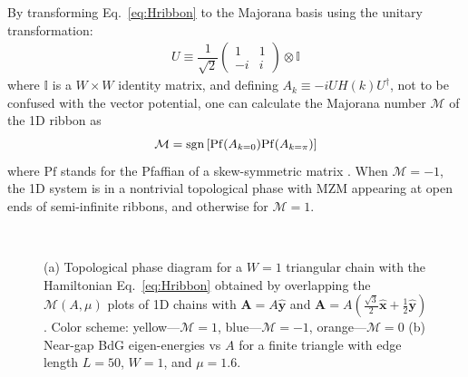 \documentclass[aps,prb,showpacs,amsmath,twocolumn,amssymb,superscriptaddress]{revtex4-2}
\let\oldhat\hat
\renewcommand{\hat}[1]{\oldhat{\mathbf{#1}}}
\begin{document}
By transforming Eq.~\eqref{eq:Hribbon} to the Majorana basis using the unitary transformation:
\begin{eqnarray}
    U\equiv \dfrac{1}{\sqrt{2}} \left(
  \begin{matrix}
    1 & 1 \\
    -i & i
  \end{matrix} \right) \otimes \mathbb{I}
\end{eqnarray}
where $\mathbb{I}$ is a ${W\times W}$ identity matrix, and defining $A_k\equiv -iU H(k) U^\dag$, not to be confused with the vector potential, one can calculate the Majorana number \cite{kitaevUnpairedMajoranaFermions2001} $\mathcal{M}$ of the 1D ribbon as \cite{liTopologicalSuperconductivityInduced2014}
\begin{eqnarray}
\mathcal{M} = {\rm sgn}\left[{{\rm Pf}(A_{k=0}) {\rm Pf}(A_{k=\pi})}\right]
\end{eqnarray}
where $\text{Pf}$ stands for the Pfaffian of a skew-symmetric matrix \cite{kitaevUnpairedMajoranaFermions2001}. When $\mathcal{M} = -1$, the 1D system is in a nontrivial topological phase with MZM appearing at open ends of semi-infinite ribbons, and otherwise for $\mathcal{M} = 1$.

\begin{figure}[ht]
  \hspace{6pt}
   \\
  \vspace{-15pt}
\caption{(a) Topological phase diagram for a $W=1$ triangular chain with the Hamiltonian Eq.~\eqref{eq:Hribbon} obtained by overlapping the $\mathcal{M}(A, \mu)$ plots of 1D chains with $\mathbf A = A\hat{y}$ and $\mathbf A = A(\frac{\sqrt{3}}{2}\hat{x}+\frac{1}{2}\hat{y})$. Color scheme: yellow---$\mathcal{M}=1$, blue---$\mathcal{M}=-1$, orange---$\mathcal{M}=0$ (b) Near-gap BdG eigen-energies vs $A$ for a finite triangle with edge length $L = 50$, $W=1$, and $\mu=1.6$.}
  \label{fig: pd}
\end{figure}
\end{document}
